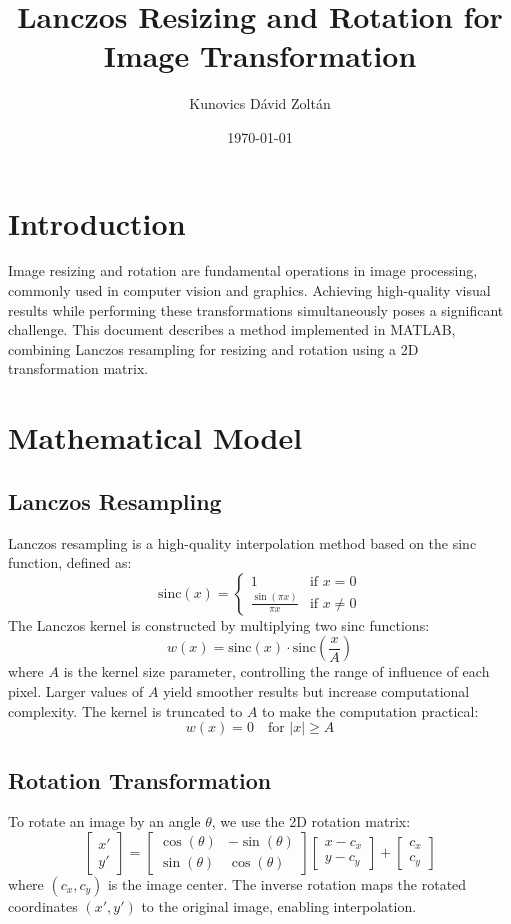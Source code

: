 \documentclass{article}
\title{Lanczos Resizing and Rotation for Image Transformation}
\author{Kunovics Dávid Zoltán}
\date{\today}
\begin{document}
\maketitle

\section{Introduction}
Image resizing and rotation are fundamental operations in image processing, commonly used in computer vision and graphics. Achieving high-quality visual results while performing these transformations simultaneously poses a significant challenge. This document describes a method implemented in MATLAB, combining Lanczos resampling for resizing and rotation using a 2D transformation matrix.

\section{Mathematical Model}

\subsection{Lanczos Resampling}
Lanczos resampling is a high-quality interpolation method based on the sinc function, defined as:
\[
\text{sinc}(x) = 
\begin{cases} 
1 & \text{if } x = 0 \\
\frac{\sin(\pi x)}{\pi x} & \text{if } x \neq 0 
\end{cases}
\]
The Lanczos kernel is constructed by multiplying two sinc functions:
\[
w(x) = \text{sinc}(x) \cdot \text{sinc}\left(\frac{x}{A}\right)
\]
where \(A\) is the kernel size parameter, controlling the range of influence of each pixel. Larger values of \(A\) yield smoother results but increase computational complexity. The kernel is truncated to \(A\) to make the computation practical:
\[
w(x) = 0 \quad \text{for } |x| \geq A
\]

\subsection{Rotation Transformation}
To rotate an image by an angle \(\theta\), we use the 2D rotation matrix:
\[
\begin{bmatrix}
x' \\
y'
\end{bmatrix}
= 
\begin{bmatrix}
\cos(\theta) & -\sin(\theta) \\
\sin(\theta) & \cos(\theta)
\end{bmatrix}
\begin{bmatrix}
x - c_x \\
y - c_y
\end{bmatrix}
+
\begin{bmatrix}
c_x \\
c_y
\end{bmatrix}
\]
where \((c_x, c_y)\) is the image center. The inverse rotation maps the rotated coordinates \((x', y')\) to the original image, enabling interpolation.
\end{document}
